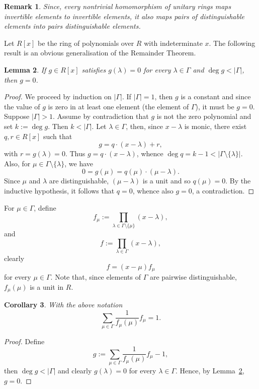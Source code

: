 \documentclass[a4paper]{amsart}
\newtheorem{lemma}{Lemma}[section]
\newtheorem{remark}[lemma]{Remark}
\newtheorem{cor}[lemma]{Corollary}
\begin{document}
\begin{remark} \label{homd}
Since, every nontrivial homomorphism of unitary rings maps invertible elements to invertible elements, it also maps pairs of distinguishable elements into pairs distinguishable elements. 
\end{remark}
Let $R[x]$ be the ring of polynomials over $R$ with indeterminate $x$. The following result is an obvious generalisation of the Remainder Theorem.
\begin{lemma}\label{Ruffini}
If $g\in R[x]$ satisfies  $g(\lambda)=0$ for every $\lambda \in \Gamma$ and $\deg g<|\Gamma|$, then $g=0$.
\end{lemma}
\begin{proof}
We proceed by induction on $|\Gamma|$. If $|\Gamma|=1$, then $g$ is a constant and since the value of $g$ is zero in at least one element (the element of $\Gamma$), it must be $g=0$. Suppose $|\Gamma|>1$.  Assume by contradiction that $g$ is not the zero polynomial and set $k:=\deg g$. Then $k<|\Gamma|$. Let $\lambda \in \Gamma$, then, since $x-\lambda$ is monic, there exist $q,r\in R[x]$ such that 
$$g=q\cdot (x-\lambda)+r,
$$
 with $r=g(\lambda)=0$.  Thus $g=q\cdot (x-\lambda)$, whence $\deg q=k-1<|\Gamma\setminus \{\lambda\}|$.
Also, for $\mu \in \Gamma\setminus \{\lambda\}$, we have
$$0=g(\mu)=q(\mu)\cdot (\mu-\lambda).
$$ 
Since $\mu$ and $\lambda$ are distinguishable, $(\mu-\lambda)$ is a unit and so $q(\mu)=0$. By the inductive hypothesis, it follows that $q=0$, whence also $g=0$, a contradiction.\end{proof}


For $\mu \in \Gamma$, define 
\begin{equation}\label{fmu}
f_\mu :=\prod_{\lambda\in {\Gamma}\setminus \{\mu\}} (x-\lambda), 
\end{equation}
and 
\begin{equation}\label{f}
f:=\prod_{\lambda\in {\Gamma}} (x-\lambda), 
\end{equation} 
clearly 
$$
f=(x-\mu)f_\mu 
$$
 for every $\mu \in \Gamma$.
Note that, since elements of $\Gamma$ are pairwise distinguishable, $f_\mu(\mu)$ is  a unit in $R$.  
\begin{cor}\label{poly1}
With the above notation
$$
\sum_{\mu \in \Gamma} \frac{1}{f_\mu(\mu)} f_\mu=1.
$$
\end{cor}
\begin{proof}
Define 
$$g:=\sum_{\mu \in \Gamma} \frac{1}{f_\mu(\mu)} f_\mu-1,
$$ then $\deg g<|\Gamma|$ and clearly $g(\lambda)=0$ for every $\lambda\in \Gamma$. Hence, by Lemma~\ref{Ruffini}, $g=0$.
\end{proof}
\end{document}
